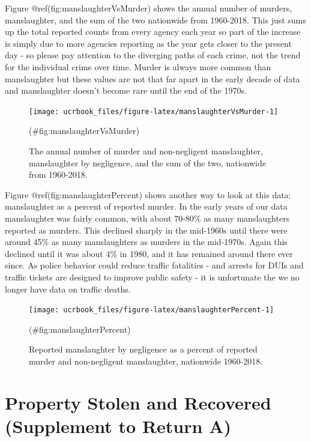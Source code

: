 \documentclass[
  12pt,
  openany]{book}
\begin{document}
Figure @ref(fig:manslaughterVsMurder) shows the annual number of murders, manslaughter, and the sum of the two nationwide from 1960-2018. This just sums up the total reported counts from every agency each year so part of the increase is simply due to more agencies reporting as the year gets closer to the present day - so please pay attention to the diverging paths of each crime, not the trend for the individual crime over time. Murder is always more common than manslaughter but these values are not that far apart in the early decade of data and manslaughter doesn't become rare until the end of the 1970s.

\begin{figure}

{\centering \texttt{[image: ucrbook\_files/figure-latex/manslaughterVsMurder-1]} 

}

\caption{The annual number of murder and non-negligent manslaughter, manslaughter by negligence, and the sum of the two, nationwide from 1960-2018.}(\#fig:manslaughterVsMurder)
\end{figure}

Figure @ref(fig:manslaughterPercent) shows another way to look at this data: manslaughter as a percent of reported murder. In the early years of our data manslaughter was fairly common, with about 70-80\% as many manslaughters reported as murders. This declined sharply in the mid-1960s until there were around 45\% as many manslaughters as murders in the mid-1970s. Again this declined until it was about 4\% in 1980, and it has remained around there ever since. As police behavior could reduce traffic fatalities - and arrests for DUIs and traffic tickets are designed to improve public safety - it is unfortunate the we no longer have data on traffic deaths.

\begin{figure}

{\centering \texttt{[image: ucrbook\_files/figure-latex/manslaughterPercent-1]} 

}

\caption{Reported manslaughter by negligence as a percent of reported murder and non-negligent manslaughter, nationwide 1960-2018.}(\#fig:manslaughterPercent)
\end{figure}

\hypertarget{stolen_property}{%
\chapter{Property Stolen and Recovered (Supplement to Return A)}\label{stolen_property}}
\end{document}
